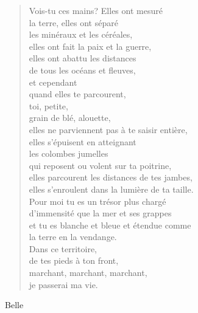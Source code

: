 \documentclass[11pt,a4paper]{book}
\begin{document}
\begin{verse}
Vois-tu ces mains? Elles ont mesuré \\
la terre, elles ont séparé \\
les minéraux et les céréales, \\
elles ont fait la paix et la guerre, \\
elles ont abattu les distances \\
de tous les océans et fleuves, \\
et cependant \\
quand elles te parcourent, \\
toi, petite, \\
grain de blé, alouette, \\
elles ne parviennent pas à te saisir entière, \\
elles s'épuisent en atteignant \\
les colombes jumelles \\
qui reposent ou volent sur ta poitrine, \\
elles parcourent les distances de tes jambes, \\
elles s'enroulent dans la lumière de ta taille. \\
Pour moi tu es un trésor plus chargé \\
d'immensité que la mer et ses grappes \\
et tu es blanche et bleue et étendue comme \\
la terre en la vendange. \\
Dans ce territoire, \\
de tes pieds à ton front, \\
marchant, marchant, marchant, \\
je passerai ma vie.
\end{verse}

\newpage

{\huge Belle} \\ \\
\end{document}
